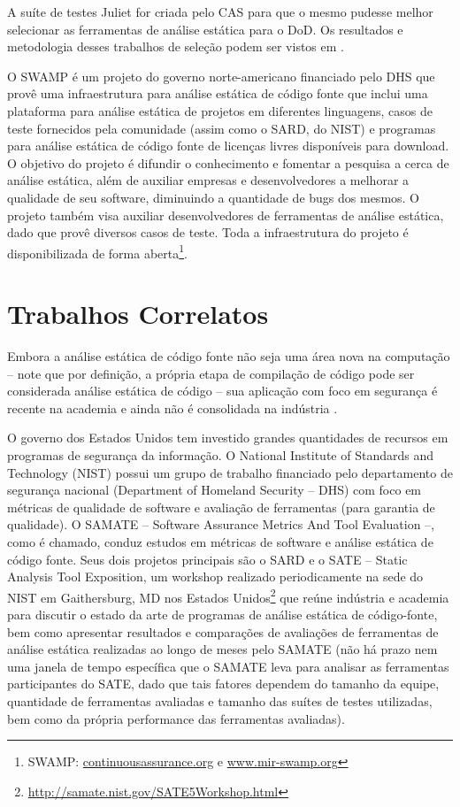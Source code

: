   A suíte de testes Juliet for criada pelo CAS para que o mesmo pudesse melhor selecionar as ferramentas de análise estática para o DoD. Os resultados e metodologia desses trabalhos de seleção podem ser vistos em \cite{nsa}.

  O SWAMP é um projeto do governo norte-americano financiado pelo DHS que provê uma infraestrutura para análise estática de código fonte que inclui uma plataforma para análise estática de projetos em diferentes linguagens, casos de teste fornecidos pela comunidade (assim como o SARD, do NIST) e programas para análise estática de código fonte de licenças livres disponíveis para download. O objetivo do projeto é difundir o conhecimento e fomentar a pesquisa a cerca de análise estática, além de auxiliar empresas e desenvolvedores a melhorar a qualidade de seu software, diminuindo a quantidade de bugs dos mesmos. O projeto também visa auxiliar desenvolvedores de ferramentas de análise estática, dado que provê diversos casos de teste. Toda a infraestrutura do projeto é disponibilizada de forma aberta\footnote{SWAMP: \url{continuousassurance.org} e \url{www.mir-swamp.org}}.                   

  \section{Trabalhos Correlatos}

  Embora a análise estática de código fonte não seja uma  área nova na computação – note que por definição, a própria etapa de compilação de código pode ser considerada análise estática de código – sua aplicação com foco em segurança é recente na academia e ainda não é consolidada na indústria \cite{johnson2013don}.

O governo dos Estados Unidos tem investido grandes quantidades de recursos em programas de segurança da informação. O National Institute of Standards and Technology (NIST) possui um grupo de trabalho financiado pelo departamento de segurança nacional (Department of Homeland Security – DHS) com foco em métricas de qualidade de software e avaliação de ferramentas (para garantia de qualidade). O SAMATE – Software Assurance Metrics And Tool Evaluation –, como é chamado, conduz estudos em métricas de software e análise estática de código fonte. Seus dois projetos principais são o SARD e o SATE – Static Analysis Tool Exposition, um workshop realizado periodicamente na sede do NIST em Gaithersburg, MD nos Estados Unidos\footnote{\url{http://samate.nist.gov/SATE5Workshop.html}} que reúne indústria e academia para discutir o estado da arte de programas de análise estática de código-fonte, bem como apresentar resultados e comparações de avaliações de ferramentas de análise estática realizadas ao longo de meses pelo SAMATE (não há prazo nem uma janela de tempo específica que o SAMATE leva para analisar as ferramentas participantes do SATE, dado que tais fatores dependem do tamanho da equipe, quantidade de ferramentas avaliadas e tamanho das suítes de testes utilizadas, bem como da própria performance das ferramentas avaliadas).

